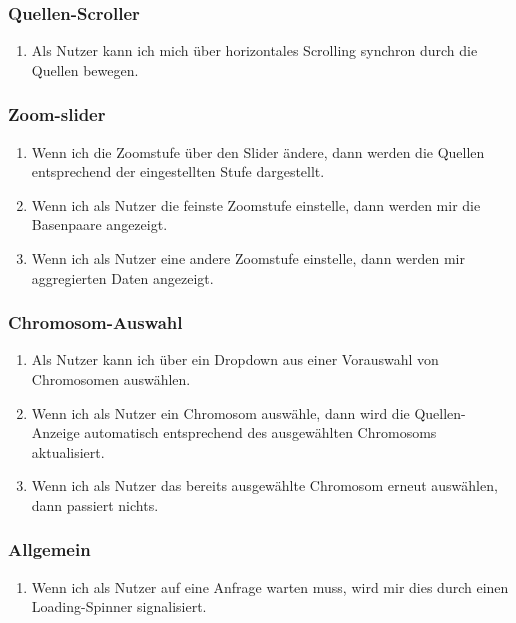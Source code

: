 \subsubsection{Quellen-Scroller}
\begin{enumerate}
	\item Als Nutzer kann ich mich über horizontales Scrolling synchron durch die Quellen bewegen.
\end{enumerate}

\subsubsection{Zoom-slider}
\begin{enumerate}
	\item Wenn ich die Zoomstufe über den Slider ändere, dann werden die Quellen entsprechend der eingestellten Stufe dargestellt.
	\item Wenn ich als Nutzer die feinste Zoomstufe einstelle, dann werden mir die Basenpaare angezeigt.
	\item Wenn ich als Nutzer eine andere Zoomstufe einstelle, dann werden mir aggregierten Daten angezeigt.
\end{enumerate}

\subsubsection{Chromosom-Auswahl}
\begin{enumerate}
	\item Als Nutzer kann ich über ein Dropdown aus einer Vorauswahl von Chromosomen auswählen.
	\item Wenn ich als Nutzer ein Chromosom auswähle, dann wird die Quellen-Anzeige automatisch entsprechend des ausgewählten Chromosoms aktualisiert.
	\item Wenn ich als Nutzer das bereits ausgewählte Chromosom erneut auswählen, dann passiert nichts.
\end{enumerate}

\subsubsection{Allgemein}
\begin{enumerate}
	\item Wenn ich als Nutzer auf eine Anfrage warten muss, wird mir dies durch einen Loading-Spinner signalisiert.	
\end{enumerate}
\newpage

